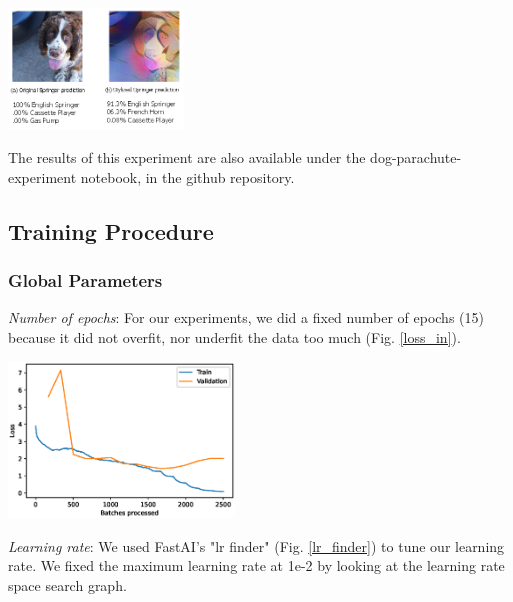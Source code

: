\documentclass{article}
\begin{document}
\begin{center}
  \captionsetup{type=figure}
  \includegraphics[width=0.35\textwidth]{imgs/experiment-1/stylized-imagenette-160-dog-predictions}
  \label{stylized-imagenette-160-dog-predictions}
\end{center}

\noindent
The results of this experiment are also available under the dog-parachute-experiment notebook, 
in the github repository.

\newpage
\subsection{Training Procedure}


\subsubsection{Global Parameters}

\textit{Number of epochs}: For our experiments, we did a fixed number of epochs
 (15) because it did not overfit, nor underfit the data too much (Fig. \ref{loss_in}).

 \begin{center}
  \captionsetup{type=figure}
  \includegraphics[width = 0.45\textwidth]{imgs/sin/loss}
  \label{loss_in}
\end{center}

\textit{Learning rate}: We used FastAI's "lr finder" (Fig. \ref{lr_finder}) to tune our learning rate.
We fixed the maximum learning rate at 1e-2 by looking at the learning rate space search graph.
\end{document}
